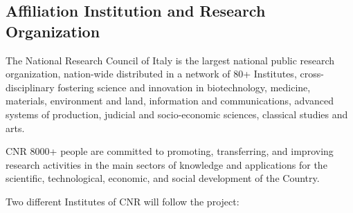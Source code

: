 \clearpage
\subsection{\texorpdfstring{Affiliation Institution and Research
Organization
}{Affiliation Institution and Research Organization }}\label{affiliation-institution-and-research-organization}

The National Research Council of Italy is the largest national public
research organization, nation-wide distributed in a network of 80+
Institutes, cross-disciplinary fostering science and innovation in
biotechnology, medicine, materials, environment and land, information
and communications, advanced systems of production, judicial and
socio-economic sciences, classical studies and arts.

CNR 8000+ people are committed to promoting, transferring, and improving
research activities in the main sectors of knowledge and applications
for the scientific, technological, economic, and social development of
the Country.

Two different Institutes of CNR will follow the project:

